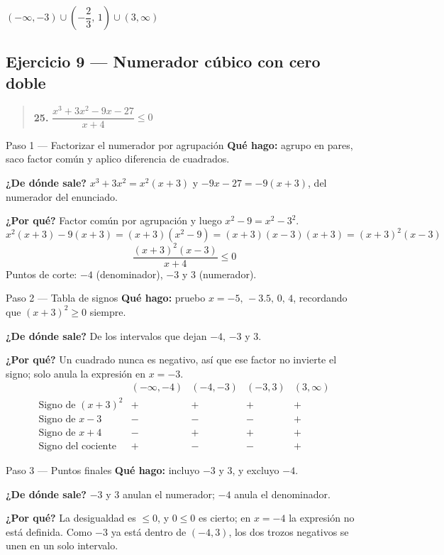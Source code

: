 \documentclass[11pt]{article}
\begin{document}
\begin{resp}
$(-\infty,-3)\cup\left(-\dfrac{2}{3},\,1\right)\cup(3,\infty)$
\end{resp}

\subsection*{Ejercicio 9 — Numerador cúbico con cero doble}

\begin{quote}
\textbf{25.} $\dfrac{x^3+3x^2-9x-27}{x+4}\le 0$
\end{quote}

\begin{paso}{Paso 1 --- Factorizar el numerador por agrupación}
\textbf{Qué hago:} agrupo en pares, saco factor común y aplico diferencia de cuadrados.

\textbf{¿De dónde sale?} $x^3+3x^2=x^2(x+3)$ y $-9x-27=-9(x+3)$, del numerador del enunciado.

\textbf{¿Por qué?} Factor común por agrupación y luego $x^2-9=x^2-3^2$.
\[
x^2(x+3)-9(x+3)=(x+3)(x^2-9)=(x+3)(x-3)(x+3)=(x+3)^2(x-3)
\]
\[
\frac{(x+3)^2(x-3)}{x+4}\le 0
\]
Puntos de corte: $-4$ (denominador), $-3$ y $3$ (numerador).
\end{paso}

\begin{paso}{Paso 2 --- Tabla de signos}
\textbf{Qué hago:} pruebo $x=-5,\,-3.5,\,0,\,4$, recordando que $(x+3)^2\ge 0$ siempre.

\textbf{¿De dónde sale?} De los intervalos que dejan $-4$, $-3$ y $3$.

\textbf{¿Por qué?} Un cuadrado nunca es negativo, así que ese factor no invierte el signo; solo anula la expresión en $x=-3$.
\[
\begin{array}{l|cccc}
 & (-\infty,-4) & (-4,-3) & (-3,3) & (3,\infty)\\\hline
\text{Signo de } (x+3)^2 & + & + & + & +\\
\text{Signo de } x-3 & - & - & - & +\\
\text{Signo de } x+4 & - & + & + & +\\\hline
\text{Signo del cociente} & + & - & - & +
\end{array}
\]
\end{paso}

\begin{paso}{Paso 3 --- Puntos finales}
\textbf{Qué hago:} incluyo $-3$ y $3$, y excluyo $-4$.

\textbf{¿De dónde sale?} $-3$ y $3$ anulan el numerador; $-4$ anula el denominador.

\textbf{¿Por qué?} La desigualdad es $\le 0$, y $0\le 0$ es cierto; en $x=-4$ la expresión no está definida. Como $-3$ ya está dentro de $(-4,3)$, los dos trozos negativos se unen en un solo intervalo.
\end{paso}
\end{document}
